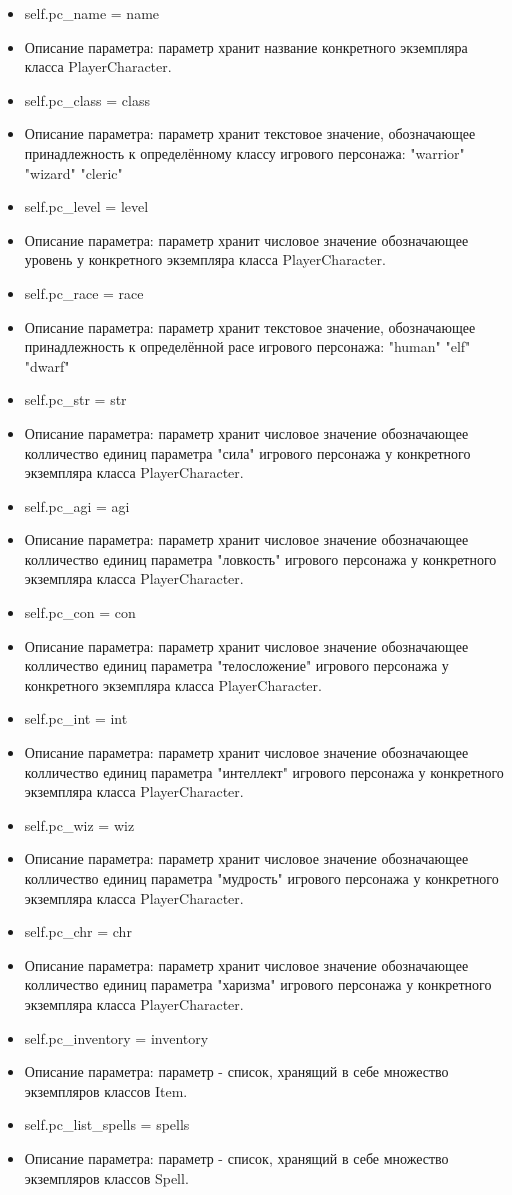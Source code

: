\begin{itemize}
	\item self.pc\_name = name 
	\item Описание параметра: параметр хранит название конкретного экземпляра класса PlayerCharacter.
	\item self.pc\_class = class 
	\item Описание параметра: параметр хранит текстовое значение, обозначающее принадлежность к определённому классу игрового персонажа: "warrior" "wizard" "cleric"
	\item self.pc\_level = level 
	\item Описание параметра: параметр хранит числовое значение обозначающее уровень у конкретного экземпляра класса PlayerCharacter.
	\item self.pc\_race = race 
	\item Описание параметра: параметр хранит текстовое значение, обозначающее принадлежность к определённой расе игрового персонажа: "human" "elf" "dwarf"
	\item self.pc\_str = str 
	\item Описание параметра: параметр хранит числовое значение обозначающее колличество единиц параметра "сила" игрового персонажа у конкретного экземпляра класса PlayerCharacter.
	\item self.pc\_agi = agi 
	\item Описание параметра: параметр хранит числовое значение обозначающее колличество единиц параметра "ловкость" игрового персонажа у конкретного экземпляра класса PlayerCharacter.
	\item self.pc\_con = con 
	\item Описание параметра: параметр хранит числовое значение обозначающее колличество единиц параметра "телосложение" игрового персонажа у конкретного экземпляра класса PlayerCharacter.
	\item self.pc\_int = int 
	\item Описание параметра: параметр хранит числовое значение обозначающее колличество единиц параметра "интеллект" игрового персонажа у конкретного экземпляра класса PlayerCharacter.
	\item self.pc\_wiz = wiz 
	\item Описание параметра: параметр хранит числовое значение обозначающее колличество единиц параметра "мудрость" игрового персонажа у конкретного экземпляра класса PlayerCharacter.
	\item self.pc\_chr = chr
	\item Описание параметра: параметр хранит числовое значение обозначающее колличество единиц параметра "харизма" игрового персонажа у конкретного экземпляра класса PlayerCharacter.
	\item self.pc\_inventory = inventory
	\item Описание параметра: параметр - список, хранящий в себе множество экземпляров классов Item.
	\item self.pc\_list\_spells = spells
	\item Описание параметра: параметр - список, хранящий в себе множество экземпляров классов Spell.
\end{itemize}
